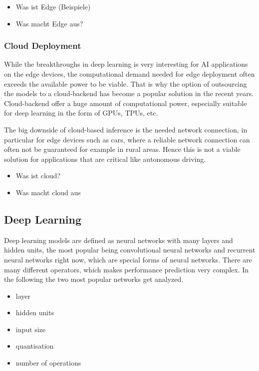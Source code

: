 \begin{itemize}
    \item Was ist Edge (Beispiele)
    \item Was macht Edge aus?
\end{itemize}
\subsubsection{Cloud Deployment}
While the breakthroughs in deep learning is very interesting for AI applications on the edge devices, the computational demand needed for edge deployment often exceeds the available power to be viable.
That is why the option of outsourcing the models to a cloud-backend has become a popular solution in the recent years.
Cloud-backend offer a huge amount of computational power, especially suitable for deep learning in the form of GPUs, TPUs, etc.


The big downside of cloud-based inference is the needed network connection, in particular for edge devices such as cars, where a reliable network connection can often not be guaranteed for example in rural areas. Hence this is not a viable solution for applications that are critical like autonomous driving.
\begin{itemize}
    \item Was ist cloud?
    \item Was macht cloud aus
\end{itemize}

\subsection{Deep Learning}
Deep learning models are defined as neural networks with many layers and hidden units, the most popular being convolutional neural networks and recurrent neural networks right now, which are special forms of neural networks.
There are many different operators, which makes performance prediction very complex.
In the following the two most popular networks get analyzed.

\begin{itemize}
    \item layer
    \item hidden units
    \item input size
    \item quantisation
    \item number of operations
\end{itemize}
